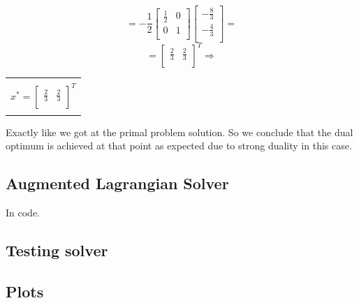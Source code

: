 \documentclass[12pt]{article}
\newcommand{\rectres}[1]{
\begin{center}
\begin{tabular}{ |c| }
\hline
\\
 #1\\
 \\
\hline
\end{tabular}
\end{center}
}
\begin{document}
  $$=-\frac{1}{2}
  \begin{bmatrix}
               \frac{1}{2} & 0 \\
               0 & 1 \\
  \end{bmatrix}\begin{bmatrix}   -\frac{8}{3} \\ -\frac{4}{3}\\ \end{bmatrix}=$$
$$=\begin{bmatrix} \frac{2}{3} & \frac{2}{3}\\ \end{bmatrix}^T \Rightarrow$$

\rectres{$x^*=\begin{bmatrix} \frac{2}{3} & \frac{2}{3}\\ \end{bmatrix}^T$}

Exactly like we got at the primal problem solution. So we conclude that the dual optimum is achieved at that point as expected due to strong duality in this case.

\subsection{Augmented Lagrangian Solver}
In code.

\subsection{Testing solver}

\subsection{Plots}
\end{document}
